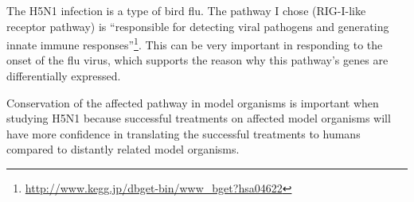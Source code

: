 \documentclass[12pt, a4paper]{report}
\begin{document}
The H5N1 infection is a type of bird flu. The pathway I chose (RIG-I-like receptor pathway) is ``responsible for detecting viral pathogens and generating innate immune responses''\footnote{\url{http://www.kegg.jp/dbget-bin/www_bget?hsa04622}}. This can be very important in responding to the onset of the flu virus, which supports the reason why this pathway's genes are differentially expressed.

Conservation of the affected pathway in model organisms is important when studying H5N1 because successful treatments on affected model organisms will have more confidence in translating the successful treatments to humans compared to distantly related model organisms.
\end{document}

